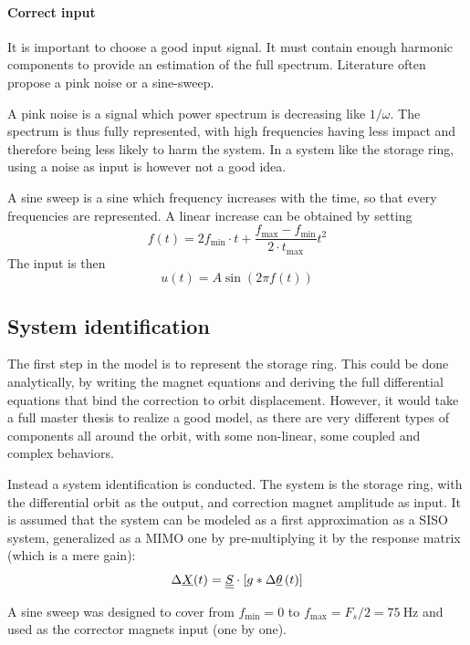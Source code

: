 \paragraph{Correct input}
It is important to choose a good input signal. It must contain enough harmonic components to provide an estimation of the full spectrum. Literature often propose a pink noise or a sine-sweep.

A pink noise is a signal which power spectrum is decreasing like $1/\omega$. The spectrum is thus fully represented, with high frequencies having less impact and therefore being less likely to harm the system. In a system like the storage ring, using a noise as input is however not a good idea. 

A sine sweep is a sine which frequency increases with the time, so that every frequencies are represented. A linear increase can be obtained by setting
\begin{equation}
	f(t) = 2 f_\text{min} \cdot t + \frac{f_\text{max}-f_\text{min}}{2 \cdot t_\text{max}} t^2
\end{equation}
The input is then
\begin{equation}
	u(t) = A \sin(2\pi f(t))
\end{equation}

\subsection{System identification}
The first step in the model is to represent the storage ring. This could be done analytically, by writing the magnet equations and deriving the full differential equations that bind the correction to orbit displacement. However, it would take a full master thesis to realize a good model, as there are very different types of components all around the orbit, with some non-linear, some coupled and complex behaviors.

Instead a system identification is conducted. The system is the storage ring, with the differential orbit as the output, and correction magnet amplitude as input. It is assumed that the system can be modeled as a first approximation as a SISO system, generalized as a MIMO one by pre-multiplying it by the response matrix (which is a mere gain):
\begin{equation}
	\Delta \underline{X}(t) = \underline{\underline{S}}\cdot \left[ g * \Delta\underline{\theta} \, (t) \right]
\end{equation}

A sine sweep was designed to cover from $f_\text{min} = 0$ to $f_\text{max} = F_s/2 = \SI{75}{\hertz}$ and used as the corrector magnets input (one by one).

